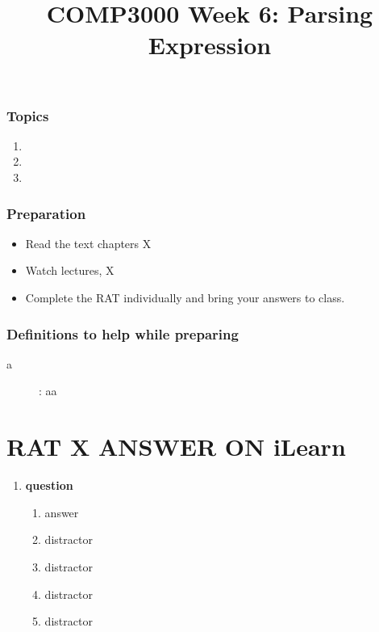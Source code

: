 \documentclass[twoside=false, DIV=14]{scrartcl}
\title{\color{redish} \vspace{-1em}COMP3000 Week 6: Parsing Expression}
\begin{document}
{\color{blackish}\maketitle}\vspace{-7em}

\begin{abstract}
\end{abstract}

\section*{Topics}
\begin{enumerate}
\item
\item
\item
\end{enumerate}

\section*{Preparation}
\begin{itemize}
\item Read the text chapters X
\item Watch lectures, X
\item Complete the RAT individually and bring your answers to class.
\end{itemize}

\section*{Definitions to help while preparing}
\begin{description}
\item[a]: aa
\end{description}

\newpage
\part*{RAT X \hspace{6em} {\small ANSWER ON iLearn}}
\renewcommand{\labelenumii}{\alph{enumii}) $\square$}
\begin{enumerate}
\item \textbf{question}
\begin{enumerate}
  \item answer \tick
  \item distractor
  \item distractor
  \item distractor
  \item distractor
\end{enumerate}

\end{enumerate}
\end{document}
